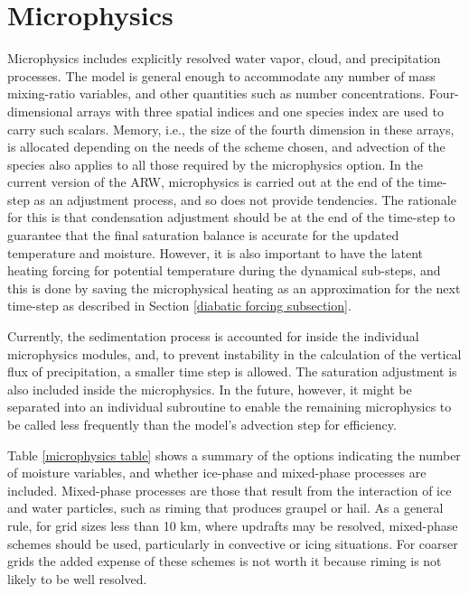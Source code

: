 \section{Microphysics}

Microphysics includes explicitly resolved water vapor, cloud, and 
precipitation processes. The model is general enough to accommodate any 
number of mass mixing-ratio variables, and other quantities
such as number concentrations. Four-dimensional arrays with three spatial
indices and one species index are used to carry such scalars.
Memory, i.e., the size of the fourth dimension in these
arrays, is allocated depending on the needs of the scheme chosen, 
and advection of the species also applies to all those required 
by the microphysics option. In the current version of the ARW, microphysics 
is carried out at the end of the time-step as an adjustment process, 
and so does not provide tendencies. The rationale for this is that 
condensation adjustment should be at the end of the time-step
to guarantee that the final saturation balance is accurate for the 
updated temperature and moisture. However, it is also important to 
have the latent heating forcing for potential temperature during the 
dynamical sub-steps, and this is done by saving the microphysical 
heating as an approximation for the next time-step as described in Section
\ref{diabatic forcing subsection}.

Currently, the sedimentation process is accounted for inside the 
individual microphysics modules, 
and, to prevent instability in the calculation of the vertical flux of
precipitation, a smaller time step is allowed. The saturation adjustment is also 
included inside the microphysics. In the future, however, it might be separated 
into an individual 
subroutine to enable the remaining microphysics to be called less frequently 
than the model's advection step for efficiency.

Table \ref{microphysics table} shows a summary of the options indicating the
number of moisture variables, and whether ice-phase and mixed-phase
processes are included. Mixed-phase processes are those that result from
the interaction of ice and water particles, such as riming that produces
graupel or hail.
As a general rule, for grid sizes less than 10 km, where updrafts may be
resolved, mixed-phase schemes should be used, particularly in convective
or icing situations. For coarser grids the added expense of these schemes
is not worth it because riming is not likely to be well resolved.

